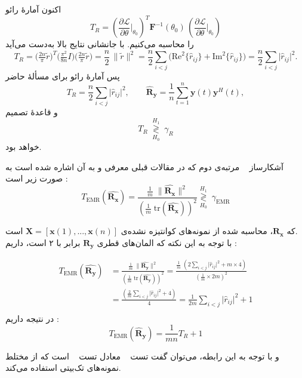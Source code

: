 \begin{اثبات}
	اکنون آمارۀ رائو
	\[
	T_R=\left(\frac{\partial \mathcal{L}}{\partial \theta}\Big|_{\theta_0}\right)^{\!T}
	\mathbf{F}^{-1}(\theta_0)\,
	\left(\frac{\partial \mathcal{L}}{\partial \theta}\Big|_{\theta_0}\right)
	\]
	را محاسبه می‌کنیم. با جانشانی نتایج بالا به‌دست می‌آید
	\[
	T_R=\Big(\tfrac{2n}{\pi}\tilde r\Big)^{\!T}
	\Big(\tfrac{\pi^{2}}{8n}I\Big)
	\Big(\tfrac{2n}{\pi}\tilde r\Big)
	=\frac{n}{2}\,\|\tilde r\|^{2}
	=\frac{n}{2}\sum_{i<j}\Big(\mathrm{Re}^{2}\{\hat r_{ij}\}+\mathrm{Im}^{2}\{\hat r_{ij}\}\Big)
	=\frac{n}{2}\sum_{i<j}\big|\hat r_{ij}\big|^{2}.
	\]
	پس آمارۀ رائو برای مسألهٔ حاضر
	\[
	T_R=\frac{n}{2}\sum_{i<j}\big|\hat r_{ij}\big|^{2},\qquad
	\hat{\mathbf{R}}_{\mathbf{y}}=\frac{1}{n}\sum_{t=1}^{n}\mathbf{y}(t)\mathbf{y}^{H}(t),
	\]
	و قاعدهٔ تصمیم
	\[
	T_R \;\underset{H_0}{\overset{H_1}{\gtrless}}\; \gamma_R
	\]
	خواهد بود.
	
\end{اثبات}


آشکارساز \  مرتبه‌ی دوم که در مقالات قبلی معرفی و به آن اشاره شده است به صورت زیر است :
\begin{equation}
	T_{\mathrm{EMR}}(\hat{\mathbf{R}_\mathbf{x}})=\frac{\frac{1}{m}\; \|\hat{\mathbf{R}_\mathbf{x}}\|^2}{\left(\frac{1}{m}\; \mathrm{tr}(\hat{\mathbf{R}_\mathbf{x}})\right)^2}\underset{H_0}{\overset{H_1}{\gtrless}}\; \gamma_{\mathrm{EMR}}
\end{equation}

که 
$\mathbf{R}_\mathbf{x}$،
 محاسبه شده از نمونه‌های کوانتیزه نشده‌ی
$\mathbf{X}=[\mathbf{x}(1), ..., \mathbf{x}(n)]$
است.\\
با توجه به این نکته که المان‌های قطری 
$\mathbf{R}_\mathbf{y}$
برابر با ۲ است، داریم :


\begin{align*}
	T_{\mathrm{EMR}}(\hat{\mathbf{R}_\mathbf{y}})&=\frac{\frac{1}{m}\; \|\hat{\mathbf{R}_\mathbf{y}}\|^2}{\left(\frac{1}{m}\; \mathrm{tr}(\hat{\mathbf{R}_\mathbf{y}})\right)^2}=\frac{\frac{1}{m}\; \left(2\sum_{i<j}\big|\hat r_{ij}\big|^{2}+m\times4\right)}{\left(\frac{1}{m}\times 2m\right)^2}\\
	&=\frac{\left(\frac{2}{m}\sum_{i<j}\big|\hat r_{ij}\big|^{2}+4\right)}{4}=\frac{1}{2m} \sum_{i<j}\big|\hat r_{ij}\big|^{2} + 1\\
\end{align*}
در نتیجه داریم :
\begin{equation}
	T_{\mathrm{EMR}}(\hat{\mathbf{R}}_{\mathbf{y}})=\frac{1}{mn}T_R + 1
\end{equation}

و با توجه به این رابطه، می‌توان گفت تست \  معادل تست \  است که از  مختلط نمونه‌های تک‌بیتی استفاده می‌کند.
